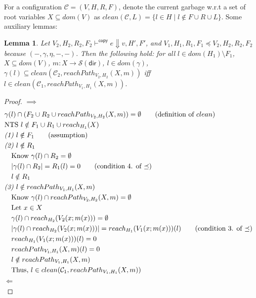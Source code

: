 \documentclass{easychair}
\newcommand{\ms}[1]{\ensuremath{\mathsf{#1}}}
\newtheorem{lemma}[theorem]{Lemma}
\theoremstyle{definition}
\begin{document}
For a configuration $\mathcal{C} = (V,H,R,F)$, denote the current garbage w.r.t a set of root variables 
$X \subseteq dom(V)$ 
as $clean(\mathcal{C},L) = \{l \in H \mid l \notin F \cup R \cup L\}$. Some auxiliary lemmas: 

\begin{lemma}\label{itm:aux}
Let $V_2,H_2,R_2,F_2 \vdash^{\mathsf{copy}} e \Downarrow v,H',F'$, and 
$V_1,H_1,R_1,F_1 \preceq V_2,H_2,R_2,F_2$ because $(-,\gamma,\eta,-,-)$. Then the following hold:
for all $l \in dom(H_1) \setminus F_1$, 
	$X \subseteq dom(V)$, $m : X \to \mathcal{S}(\ms{dir})$, $l \in dom(\gamma)$,
	$\gamma(l) \subseteq clean(\mathcal{C}_2,reachPath_{V_2,H_2}(X,m))$ iff
	$l \in clean(\mathcal{C}_1,reachPath_{V_1,H_1}(X,m))$.
\end{lemma}

\begin{proof}
	$\implies$
	\begin{align*}
		&\gamma(l) \cap (F_2 \cup R_2 \cup reachPath_{V_2,H_2}(X,m)) = 
			\emptyset \tag{definition of $clean$}\\
		&\text{NTS } l \notin F_1 \cup R_1 \cup reach_{H_1}(X)\\
		&\emph{(1) } l \notin F_1 \tag{assumption}\\
		&\emph{(2) } l \notin R_1\\
		&\quad \text{Know } \gamma(l) \cap R_2 = \emptyset\\
		&\quad |\gamma(l) \cap R_2| = R_1(l) = 0 \tag{condition 4. of $\preceq$}\\
		&\quad l \notin R_1\\
		&\emph{(3) } l \notin reachPath_{V_1,H_1}(X,m)\\
		&\quad \text{Know } \gamma(l) \cap reachPath_{V_2,H_2}(X,m) = \emptyset\\
		&\quad \text{Let } x \in X\\
		&\quad \gamma(l) \cap reach_{H_2}(V_2(x;m(x))) = \emptyset\\
		&\quad |\gamma(l) \cap reach_{H_2}(V_2(x;m(x)))| = reach_{H_1}(V_1(x;m(x)))(l) 
			\tag{condition 3. of $\preceq$}\\
		&\quad reach_{H_1}(V_1(x;m(x)))(l) = 0\\
		&\quad reachPath_{V_1,H_1}(X,m)(l) = 0\\
		&\quad l \notin reachPath_{V_1,H_1}(X,m)\\
		&\quad \text{Thus, } l \in clean(\mathcal{C}_1,reachPath_{V_1,H_1}(X,m))
	\end{align*}
	$\Longleftarrow$
	\begin{align*}

\end{align*}
\end{proof}
\end{document}
